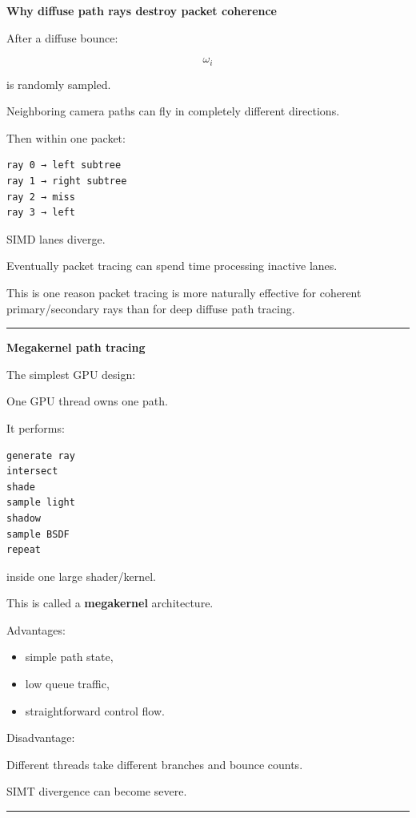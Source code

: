 \textbf{Why diffuse path rays destroy packet coherence}

After a diffuse bounce:

\[
\omega_i
\]

is randomly sampled.

Neighboring camera paths can fly in completely different directions.

Then within one packet:

\begin{verbatim}
ray 0 → left subtree
ray 1 → right subtree
ray 2 → miss
ray 3 → left
\end{verbatim}

SIMD lanes diverge.

Eventually packet tracing can spend time processing inactive lanes.

This is one reason packet tracing is more naturally effective for coherent primary/secondary rays than for deep diffuse path tracing.

\begin{center}\rule{0.5\linewidth}{0.5pt}\end{center}

\textbf{Megakernel path tracing}

The simplest GPU design:

One GPU thread owns one path.

It performs:

\begin{verbatim}
generate ray
intersect
shade
sample light
shadow
sample BSDF
repeat
\end{verbatim}

inside one large shader/kernel.

This is called a \textbf{megakernel} architecture.

Advantages:

\begin{itemize}
\tightlist
\item
  simple path state,
\item
  low queue traffic,
\item
  straightforward control flow.
\end{itemize}

Disadvantage:

Different threads take different branches and bounce counts.

SIMT divergence can become severe.

\begin{center}\rule{0.5\linewidth}{0.5pt}\end{center}


